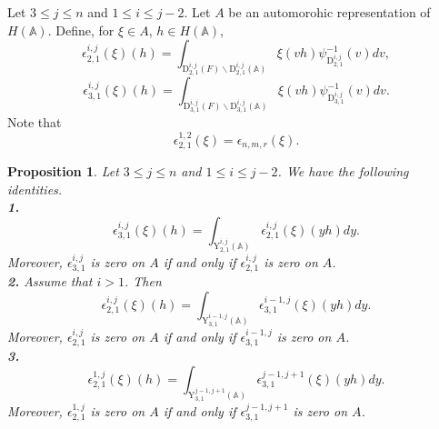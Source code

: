 \documentclass[12pts]{amsart}
\newcommand{\BA}{{\mathbb {A}}}
\newtheorem{prop}[thm]{Proposition}
\begin{document}
Let $3\leq j\leq n$ and $1\leq i\leq j-2$. Let $A$ be an automorohic representation of $H(\BA)$. Define, for $\xi \in A$, $h\in H(\BA)$,
\begin{equation}\label{7.1}
\epsilon_{2,1}^{i,j}(\xi)(h)=\int_{\mathrm{D}_{2,1}^{i,j}(F)\backslash
	\mathrm{D}_{2,1}^{i,j}(\BA)}\xi(vh)\psi_{\mathrm{D}_{2,1}^{i,j}}^{-1}(v)dv,
\end{equation}
$$
\epsilon_{3,1}^{i,j}(\xi)(h)=\int_{\mathrm{D}_{3,1}^{i,j}(F)\backslash
	\mathrm{D}_{3,1}^{i,j}(\BA)}\xi(vh)\psi_{\mathrm{D}_{3,1}^{i,j}}^{-1}(v)dv.
$$
Note that
\begin{equation}\label{7.1.1}
\epsilon_{2,1}^{1,2}(\xi)=\epsilon_{n,m,r}(\xi).
\end{equation}
\begin{prop}\label{prop 7.1}
	Let $3\leq j\leq n$ and $1\leq i\leq j-2$. We have the following identities.\\
	{\bf 1.}
	$$
	\epsilon_{3,1}^{i,j}(\xi)(h)=\int_{\mathrm{Y}_{2,1}^{i,j}(\BA)}
	\epsilon_{2,1}^{i,j}(\xi)(yh)dy.
	$$
	Moreover, $\epsilon_{3,1}^{i,j}$ is zero on $A$ if and
	only if $\epsilon_{2,1}^{i,j}$ is zero on $A$.\\
	{\bf 2.} Assume that $i>1$. Then
	$$
	\epsilon_{2,1}^{i,j}(\xi)(h)=\int_{\mathrm{Y}_{3,1}^{i-1,j}(\BA)}
	\epsilon_{3,1}^{i-1,j}(\xi)(yh)dy.
	$$
	Moreover, $\epsilon_{2,1}^{i,j}$ is zero on $A$ if and
	only if $\epsilon_{3,1}^{i-1,j}$ is zero on $A$. \\
	{\bf 3.}
	$$
	\epsilon_{2,1}^{1,j}(\xi)(h)=\int_{\mathrm{Y}_{3,1}^{j-1,j+1}(\BA)}
	\epsilon_{3,1}^{j-1,j+1}(\xi)(yh)dy.
	$$
	Moreover, $\epsilon_{2,1}^{1,j}$ is zero on $A$ if and
	only if $\epsilon_{3,1}^{j-1,j+1}$ is zero on $A$.\\
\end{prop}
\end{document}
